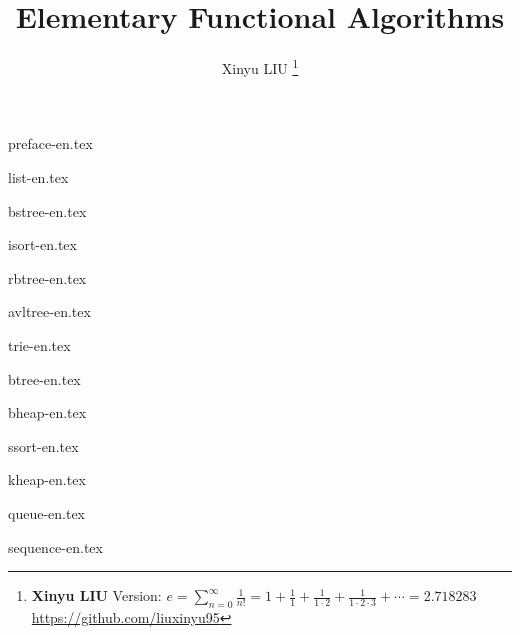 \documentclass[b5paper,twoside]{book}
\begin{document}


\title{
  {\bf \Huge Elementary Functional Algorithms}
  \centering
}

\author{Xinyu LIU
  \thanks{{\bfseries Xinyu LIU} \newline
    Version: $\displaystyle e = \sum \limits _{n=0}^{\infty }{\frac {1}{n!}} = 1 + {\frac {1}{1}}+{\frac {1}{1\cdot 2}}+{\frac {1}{1\cdot 2\cdot 3}}+\cdots = 2.718283$ \newline
    \url{https://github.com/liuxinyu95} \newline
}}

\maketitle

\frontmatter
{preface-en.tex}
\newpage

\tableofcontents

\mainmatter

{list-en.tex}

{bstree-en.tex}

{isort-en.tex}

{rbtree-en.tex}

{avltree-en.tex}

{trie-en.tex}

{btree-en.tex}

{bheap-en.tex}

{ssort-en.tex}

{kheap-en.tex}

{queue-en.tex}

{sequence-en.tex}
\end{document}
